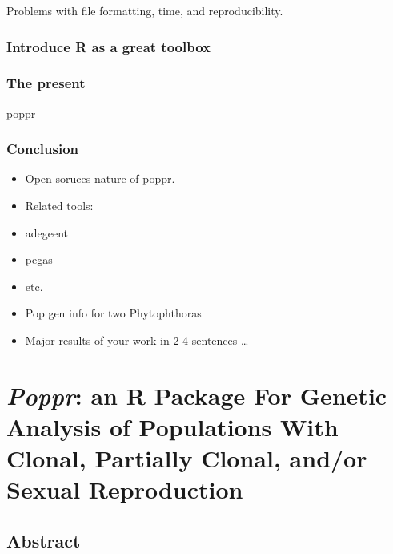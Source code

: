 \documentclass[double,12pt]{beavtex}
\providecommand{\tightlist}{%
  \setlength{\itemsep}{0pt}\setlength{\parskip}{0pt}}
\begin{document}
  Problems with file formatting, time, and reproducibility.
  
  \subsection{Introduce R as a great
  toolbox}\label{introduce-r-as-a-great-toolbox}
  
  \subsection{The present}\label{the-present}
  
  poppr
  
  \subsection{Conclusion}\label{conclusion}
  
  \begin{itemize}
  \tightlist
  \item
    Open soruces nature of poppr.
  \item
    Related tools:
  \item
    adegeent
  \item
    pegas
  \item
    etc.
  \item
    Pop gen info for two Phytophthoras
  \item
    Major results of your work in 2-4 sentences \ldots{}
  \end{itemize}
  
  \chapter{\texorpdfstring{\emph{Poppr}: an R Package For Genetic Analysis
  of Populations With Clonal, Partially Clonal, and/or Sexual
  Reproduction}{Poppr: an R Package For Genetic Analysis of Populations With Clonal, Partially Clonal, and/or Sexual Reproduction}}\label{poppr-an-r-package-for-genetic-analysis-of-populations-with-clonal-partially-clonal-andor-sexual-reproduction}
  
  \section{Abstract}\label{abstract}
  
\end{document}
